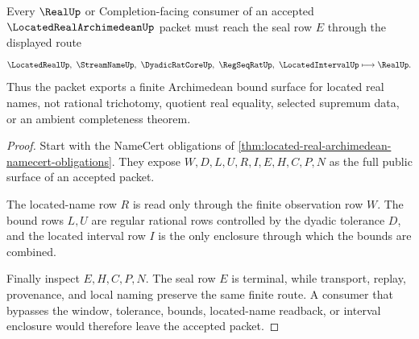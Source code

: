 \begin{theorem}
\label{thm:located-real-archimedean-real-seal-nonescape}
Every $\RealUp$ or Completion-facing consumer of an accepted $\LocatedRealArchimedeanUp$ packet must reach the seal row $E$ through the displayed route
$$
\LocatedRealUp,\ \StreamNameUp,\ \DyadicRatCoreUp,\ \RegSeqRatUp,\ \LocatedIntervalUp \longmapsto \RealUp .
$$
Thus the packet exports a finite Archimedean bound surface for located real names, not rational trichotomy, quotient real equality, selected supremum data, or an ambient completeness theorem.
\end{theorem}
\begin{proof}
Start with the NameCert obligations of \autoref{thm:located-real-archimedean-namecert-obligations}. They expose $W,D,L,U,R,I,E,H,C,P,N$ as the full public surface of an accepted packet.

The located-name row $R$ is read only through the finite observation row $W$. The bound rows $L,U$ are regular rational rows controlled by the dyadic tolerance $D$, and the located interval row $I$ is the only enclosure through which the bounds are combined.

Finally inspect $E,H,C,P,N$. The seal row $E$ is terminal, while transport, replay, provenance, and local naming preserve the same finite route. A consumer that bypasses the window, tolerance, bounds, located-name readback, or interval enclosure would therefore leave the accepted packet.
\end{proof}





